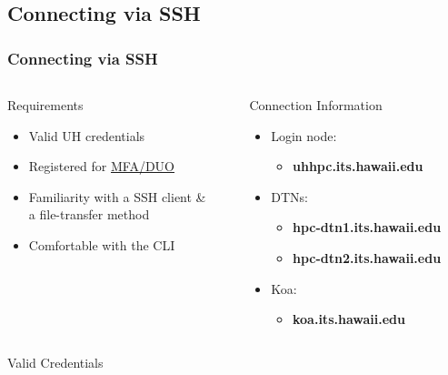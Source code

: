 \subsection[Connecting via SSH]{Connecting via SSH}
\begin{frame}
\frametitle{Connecting via SSH}
\begin{columns}
	\begin{column}{0.46\textwidth}
		\begin{block}{Requirements}
			\begin{itemize}
				\item Valid UH credentials 
				\item Registered for \href{http://www.hawaii.edu/its/uhlogin/}{MFA/DUO}
				\item Familiarity with a SSH client \&\\a file-transfer method
				\item Comfortable with the CLI
			\end{itemize}
                        \end{block}
	\end{column}
	\begin{column}{0.46\textwidth}
		\begin{block}{Connection Information}\
	\begin{itemize}
		\item Login node: 
		  \begin{itemize} 
		  \item \textbf{uhhpc.its.hawaii.edu}
		  \end{itemize}
		\item DTNs:
		  \begin{itemize} 
		  \item \textbf{hpc-dtn1.its.hawaii.edu}
		  \item \textbf{hpc-dtn2.its.hawaii.edu}
		  \end{itemize}
        \item Koa:
            \begin{itemize}
                \item \textbf{koa.its.hawaii.edu}
            \end{itemize}
	\end{itemize}
        \end{block}
	        \end{column}                
	\end{columns}
	\begin{block}{Valid Credentials}\footnotesize
		\begin{itemize}

\end{itemize}
\end{block}
\end{frame}
